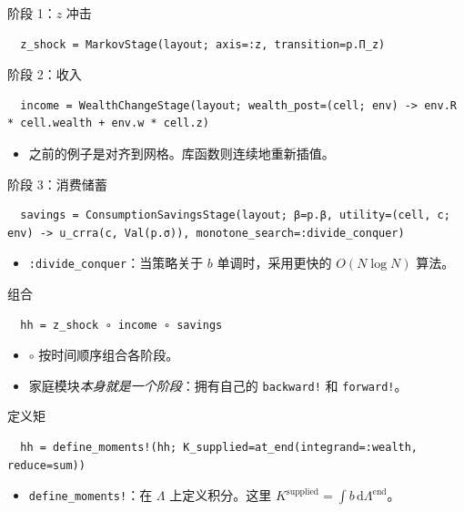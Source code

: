 \documentclass[10pt,aspectratio=169]{beamer}
\begin{document}
\begin{frame}[fragile]{阶段 1：$z$ 冲击}
  \begin{lstlisting}
  z_shock = MarkovStage(layout; axis=:z, transition=p.Π_z)
  \end{lstlisting}
\end{frame}

\begin{frame}[fragile]{阶段 2：收入}
  \begin{lstlisting}
  income = WealthChangeStage(layout; wealth_post=(cell; env) -> env.R * cell.wealth + env.w * cell.z)
  \end{lstlisting}
  \begin{itemize}
    \item 之前的例子是对齐到网格。库函数则连续地重新插值。
  \end{itemize}
\end{frame}

\begin{frame}[fragile]{阶段 3：消费储蓄}
  \begin{lstlisting}
  savings = ConsumptionSavingsStage(layout; β=p.β, utility=(cell, c; env) -> u_crra(c, Val(p.σ)), monotone_search=:divide_conquer)
  \end{lstlisting}
  \begin{itemize}
    \item \texttt{:divide\_conquer}：当策略关于 $b$ 单调时，采用更快的 $O(N \log N)$ 算法。
  \end{itemize}
\end{frame}

\begin{frame}[fragile]{组合}
  \begin{lstlisting}
  hh = z_shock ∘ income ∘ savings
  \end{lstlisting}
  \begin{itemize}
    \item \texttt{$\circ$} 按时间顺序组合各阶段。
    \item 家庭模块\emph{本身就是一个阶段}：拥有自己的 \texttt{backward!} 和 \texttt{forward!}。
  \end{itemize}
\end{frame}

\begin{frame}[fragile]{定义矩}
  \begin{lstlisting}
  hh = define_moments!(hh; K_supplied=at_end(integrand=:wealth, reduce=sum))
  \end{lstlisting}
  \begin{itemize}
    \item \texttt{define\_moments!}：在 $\Lambda$ 上定义积分。这里 $K^{\mathrm{supplied}} = \int b\,\mathrm{d}\Lambda^\text{end}$。
  \end{itemize}
\end{frame}
\end{document}
